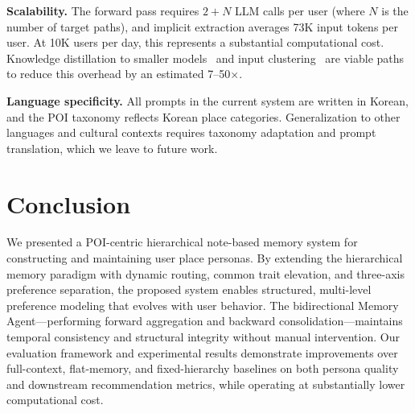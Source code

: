 \documentclass[manuscript,screen,review]{acmart}
\begin{document}
\textbf{Scalability.}
The forward pass requires $2 + N$ LLM calls per user (where $N$ is the number of target paths), and implicit extraction averages 73K input tokens per user. At 10K users per day, this represents a substantial computational cost. Knowledge distillation to smaller models~\cite{personamem-v2} and input clustering~\cite{personax} are viable paths to reduce this overhead by an estimated 7--50$\times$.

\textbf{Language specificity.}
All prompts in the current system are written in Korean, and the POI taxonomy reflects Korean place categories. Generalization to other languages and cultural contexts requires taxonomy adaptation and prompt translation, which we leave to future work.


\section{Conclusion}

We presented a POI-centric hierarchical note-based memory system for constructing and maintaining user place personas. By extending the hierarchical memory paradigm with dynamic routing, common trait elevation, and three-axis preference separation, the proposed system enables structured, multi-level preference modeling that evolves with user behavior. The bidirectional Memory Agent---performing forward aggregation and backward consolidation---maintains temporal consistency and structural integrity without manual intervention. Our evaluation framework and experimental results demonstrate improvements over full-context, flat-memory, and fixed-hierarchy baselines on both persona quality and downstream recommendation metrics, while operating at substantially lower computational cost.



\end{document}
